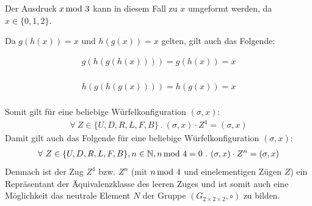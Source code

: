 \documentclass[12pt,a4paper, usenames, dvipsnames]{article}
\theoremstyle{mystyle}
\theoremstyle{definition}
\newcommand{\Gtwo}{\ensuremath{G_{2\times 2\times 2}}}
\begin{document}
Der Ausdruck $x \hspace*{-0.5em} \mod 3$ kann in diesem Fall zu $x$ umgeformt werden, da $x \in \{0,1,2\}$. 


Da $g(h(x))=x$ und $h(g(x))=x$ gelten, gilt auch das Folgende:

\begin{minipage}[H]{0.5\textwidth}
	\begin{align*}
		g(h(g(h(x)))) = g(h(x)) = x \\
	\end{align*}
\end{minipage}
\begin{minipage}[H]{0.5\textwidth}
      \begin{align*}
			h(g(h(g(x)))) = h(g(x)) = x \\
	  \end{align*}
\end{minipage}

Somit gilt für eine beliebige Würfelkonfiguration $(\sigma, x)$:
\begin{align*}
\forall \ Z \in \{U, D, R, L, F, B\} \ . \ (\sigma, x) \cdot Z^4 = (\sigma, x)
\end{align*}
Damit gilt auch das Folgende für eine beliebige Würfelkonfiguration $(\sigma, x)$:
\begin{align*}
\forall \ Z \in \{U, D, R, L, F, B\}, n \in \mathbb{N}, n \hspace*{-0.5em} \mod 4 = 0 \ . \ (\sigma, x) \cdot Z^n = (\sigma, x)
\end{align*}
Demnach ist der Zug $Z^4$ bzw. $Z^n$ (mit $n \hspace*{-0.5em} \mod 4$ und einelementigen Zügen $Z$) ein Repräsentant der Äquivalenzklasse des leeren Zuges und ist somit auch eine Möglichkeit das neutrale Element $N$ der Gruppe $(\Gtwo, \circ)$ zu bilden.
\end{document}
